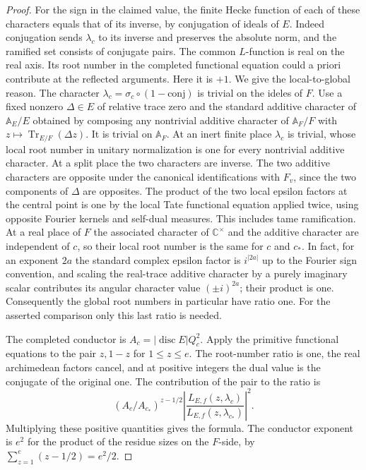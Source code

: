 \documentclass[a4paper,11pt]{article}
\theoremstyle{definition}
\theoremstyle{remark}
\numberwithin{equation}{section}
\begin{document}
\begin{proof}
For the sign in the claimed value, the finite Hecke function
of each of these characters equals that of its inverse,
by conjugation of ideals of \(E\). Indeed conjugation sends
\(\lambda_c\) to its inverse and preserves the absolute
norm, and the ramified set consists of conjugate pairs.
The common \(L\)-function is real on the real axis. Its
root number in the completed functional equation could
a priori contribute at the reflected arguments. Here it
is \(+1\). We give the local-to-global reason. The character
\(\lambda_c=\sigma_c\circ(1-\mathrm{conj})\) is trivial on
the ideles of \(F\). Use a fixed nonzero \(\Delta\in E\)
of relative trace zero and the standard additive character
of \(\mathbb A_E/E\) obtained by composing any nontrivial
additive character of \(\mathbb A_F/F\) with
\(z\mapsto\operatorname{Tr}_{E/F}(\Delta z)\).
It is trivial on \(\mathbb A_F\). At an inert finite place
\(\lambda_c\) is trivial, whose local root number in
unitary normalization is one for every nontrivial additive
character. At a split place the two characters are inverse.
The two additive characters are opposite under the canonical
identifications with \(F_v\), since the two components of
\(\Delta\) are opposites. The product of the two local
epsilon factors at the central point is one by the local
Tate functional equation applied twice, using opposite
Fourier kernels and self-dual measures. This includes tame
ramification. At a real place of \(F\) the associated
character of \(\mathbb C^\times\) and the additive character
are independent of \(c\), so their local root number is the
same for \(c\) and \(c_*\). In fact, for an exponent \(2a\)
the standard complex epsilon factor is \(i^{|2a|}\) up to
the Fourier sign convention, and scaling the real-trace
additive character by a purely imaginary scalar contributes
its angular character value \((\pm i)^{2a}\); their product
is one. Consequently the global root numbers in particular
have ratio one. For the asserted comparison only this last
ratio is needed.

The completed conductor is \(A_c=|\operatorname{disc}E|Q_c^2\).
Apply the primitive functional equations to the pair \(z,1-z\)
for \(1\le z\le e\). The root-number ratio is one, the real
archimedean factors cancel, and at positive integers the
dual value is the conjugate of the original one. The
contribution of the pair to the ratio is
\[
          (A_c/A_{c_*})^{z-1/2}
              \left|\frac{L_{E,f}(z,\lambda_c)}
                          {L_{E,f}(z,\lambda_{c_*})}\right|^2 .
\]
Multiplying these positive quantities gives the formula.
The conductor exponent is \(e^2\) for the product of the
residue sizes on the \(F\)-side, by
\(\sum_{z=1}^e(z-1/2)=e^2/2\).
\end{proof}
\end{document}
